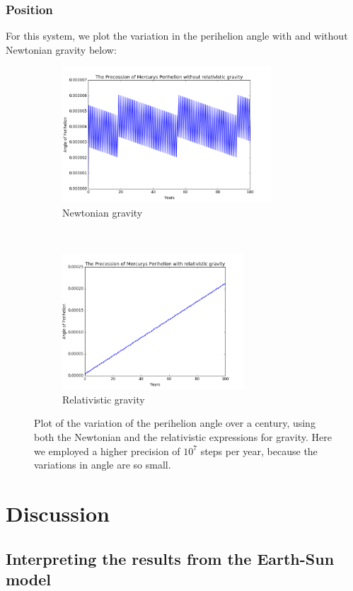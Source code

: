 \documentclass[a4paper, 10pt]{article}
\begin{document}
\subsubsection{Position}
For this system, we plot the variation in the perihelion angle with and without Newtonian gravity below:
\begin{figure}[t!]
    \centering
    \begin{subfigure}[t]{0.5\textwidth}
        \centering
        \includegraphics[height=2.0in]{angleNoRel2.png}
        \caption{Newtonian gravity}
    \end{subfigure}%
    ~ 
    \begin{subfigure}[t]{0.5\textwidth}
        \centering
        \includegraphics[height=2.0in]{angle.png}
        \caption{Relativistic gravity}
    \end{subfigure}
    \caption{Plot of the variation of the perihelion angle over a century, using both the Newtonian and the relativistic expressions for gravity. Here we employed a higher precision of $10^7$ steps per year, because the variations in angle are so small.} \label{fig:precession}
\end{figure}
\section{Discussion}
\subsection{Interpreting the results from the Earth-Sun model}
\end{document}
